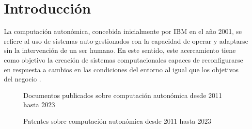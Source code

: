 \documentclass[12pt]{article}
\begin{document}
    
    
    \section{Introducción}


    La computación autonómica, concebida inicialmente por IBM en el año 2001, se refiere al uso de sistemas auto-gestionados con la capacidad de operar y adaptarse sin la intervención de un ser humano. En este sentido, este acercamiento tiene como objetivo la creación de sistemas computacionales capaces de reconfigurarse en respuesta a cambios en las condiciones del entorno al igual que los objetivos del negocio \cite{horn_2001}.

    

    \begin{figure}[ht]
        \centering
        
        \caption{Documentos publicados sobre computación autonómica desde 2011 hasta 2023} \cite{scopus} 
        \label{fig:scopus}
    \end{figure}

    \begin{figure}[ht]
        \centering
        
        \caption{Patentes sobre computación autonómica desde 2011 hasta 2023} \cite{lens} 
        \label{fig:lens}
    \end{figure}
\end{document}

